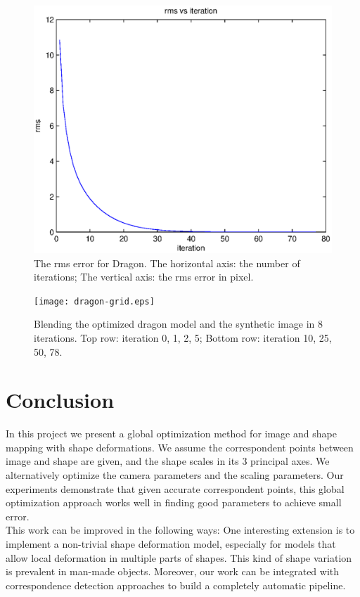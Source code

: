 \documentclass[10pt,twocolumn,letterpaper]{article}
\begin{document}
\begin{figure}[t]
\begin{center}
	\includegraphics[scale=0.55]{dragon-figure.eps}
\end{center}
	\caption{The rms error for Dragon. The horizontal axis: the number of iterations; The vertical axis: the rms error in pixel.}
\label{fig:dragonplot}
\end{figure}

\begin{figure}
\begin{center}
	\texttt{[image: dragon-grid.eps]}
\end{center}
   \caption{Blending the optimized dragon model and the synthetic image in 8 iterations. Top row: iteration 0, 1, 2, 5; Bottom row: iteration 10, 25, 50, 78.}
\label{fig:dragongrid}
\end{figure}

\section{Conclusion}

\noindent
In this project we present a global optimization method for image and shape mapping with shape deformations. We assume the correspondent points between image and shape are given, and the shape scales in its 3 principal axes. We alternatively optimize the camera parameters and the scaling parameters. Our experiments demonstrate that given accurate correspondent points, this global optimization approach works well in finding good parameters to achieve small error.\\

\noindent
This work can be improved in the following ways: One interesting extension is to implement a non-trivial shape deformation model, especially for models that allow local deformation in multiple parts of shapes. This kind of shape variation is prevalent in man-made objects. Moreover, our work can be integrated with correspondence detection approaches to build a completely automatic pipeline.

{\small


}
\end{document}
